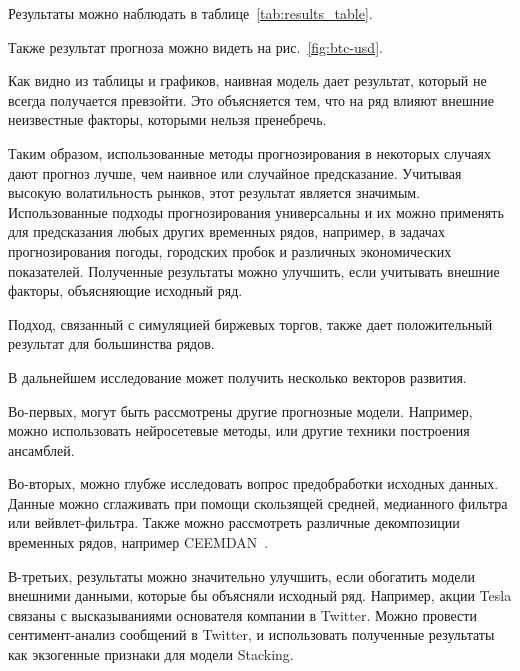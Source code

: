 \documentclass[a4paper,article,14pt]{extarticle}
\begin{document}
Результаты можно наблюдать в таблице~\ref{tab:results_table}.


Также результат прогноза можно видеть  на рис.~\ref{fig:btc-usd}.


Как видно из таблицы и графиков, наивная модель дает результат, который не всегда получается превзойти.
Это объясняется тем, что на ряд влияют внешние неизвестные факторы, которыми нельзя пренебречь.
\pagebreak


Таким образом, использованные методы прогнозирования в некоторых случаях дают прогноз лучше, чем наивное или случайное предсказание.
Учитывая высокую волатильность рынков, этот результат является значимым.
Использованные подходы прогнозирования универсальны и их можно применять для предсказания любых других временных рядов, например, в задачах прогнозирования погоды, городских пробок и различных экономических показателей.
Полученные результаты можно улучшить, если учитывать внешние факторы, объясняющие исходный ряд.

\par
Подход, связанный с симуляцией биржевых торгов, также дает положительный результат для большинства рядов.

\par
В дальнейшем исследование может получить несколько векторов развития.
\par
Во-первых, могут быть рассмотрены другие прогнозные модели.
Например, можно использовать нейросетевые методы, или другие техники построения ансамблей.
\par
Во-вторых, можно глубже исследовать вопрос предобработки исходных данных.
Данные можно сглаживать при помощи скользящей средней, медианного фильтра или вейвлет-фильтра.
Также можно рассмотреть различные декомпозиции временных рядов, например CEEMDAN~\cite{lstm_ex2}.
\par
В-третьих, результаты можно значительно улучшить, если обогатить модели внешними данными, которые бы объясняли исходный ряд.
Например, акции Tesla связаны с высказываниями основателя компании в Twitter.
Можно провести сентимент-анализ сообщений в Twitter, и использовать полученные результаты как экзогенные признаки для модели Stacking.
\end{document}
